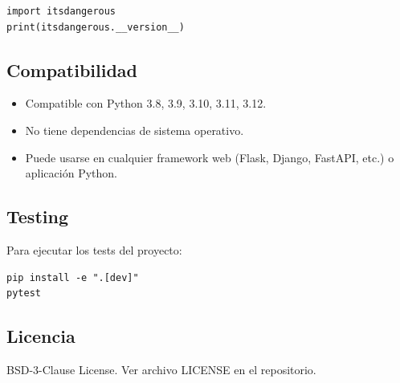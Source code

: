 \documentclass[11pt,a4paper]{article}
\begin{document}
\begin{lstlisting}
import itsdangerous
print(itsdangerous.__version__)
\end{lstlisting}


\subsection*{Compatibilidad}


\begin{itemize}[leftmargin=*,topsep=2pt,itemsep=1pt]
  \item Compatible con Python 3.8, 3.9, 3.10, 3.11, 3.12.
  \item No tiene dependencias de sistema operativo.
  \item Puede usarse en cualquier framework web (Flask, Django, FastAPI, etc.) o aplicación Python.
\end{itemize}


\subsection*{Testing}


Para ejecutar los tests del proyecto:


\begin{lstlisting}
pip install -e ".[dev]"
pytest
\end{lstlisting}


\subsection*{Licencia}


BSD-3-Clause License. Ver archivo LICENSE en el repositorio.
\end{document}
